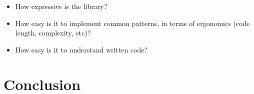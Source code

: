 \documentclass[a4paper]{article}
\begin{document}

\begin{itemize}

\item How expressive is the library?


\item How easy is it to implement common patterns, in terms of ergonomics (code
  length, complexity, etc)?

\item How easy is it to understand written code?
\end{itemize}

\section{Conclusion}

\newpage


\end{document}
